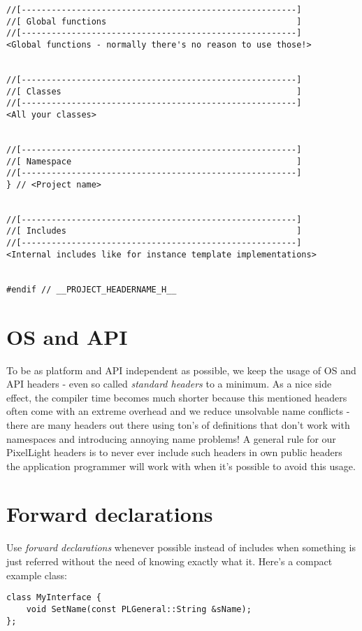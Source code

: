 \begin{lstlisting}[caption=Complete header layout]
//[-------------------------------------------------------]
//[ Global functions                                      ]
//[-------------------------------------------------------]
<Global functions - normally there's no reason to use those!>


//[-------------------------------------------------------]
//[ Classes                                               ]
//[-------------------------------------------------------]
<All your classes>


//[-------------------------------------------------------]
//[ Namespace                                             ]
//[-------------------------------------------------------]
} // <Project name>


//[-------------------------------------------------------]
//[ Includes                                              ]
//[-------------------------------------------------------]
<Internal includes like for instance template implementations>


#endif // __PROJECT_HEADERNAME_H__
\end{lstlisting}




\section{OS and API}
To be as platform and API independent as possible, we keep the usage of OS and API headers - even so called \emph{standard headers} to a minimum. As a nice side effect, the compiler time becomes much shorter because this mentioned headers often come with an extreme overhead and we reduce unsolvable name conflicts - there are many headers out there using ton's of definitions that don't work with namespaces and introducing annoying name problems! A general rule for our PixelLight headers is to never ever include such headers in own public headers the application programmer will work with when it's possible to avoid this usage.




\section{Forward declarations}
Use \emph{forward declarations} whenever possible instead of includes when something is just referred without the need of knowing exactly what it. Here's a compact example class:

\begin{lstlisting}[caption=Using forward declaration]
class MyInterface {
    void SetName(const PLGeneral::String &sName);
};
\end{lstlisting}

